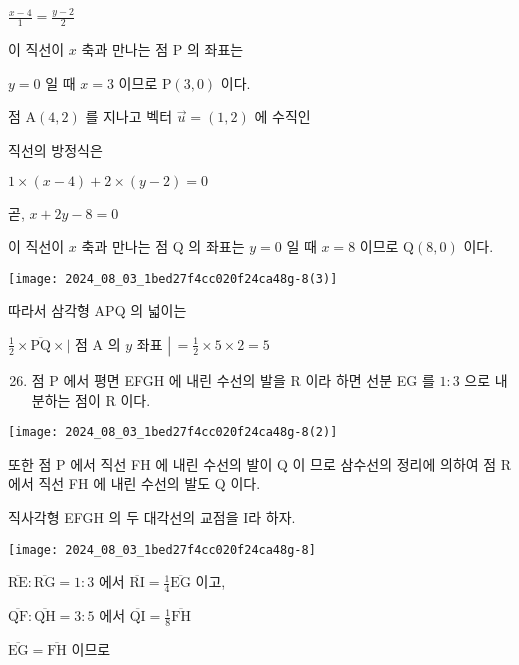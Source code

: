 \documentclass[10pt]{article}
\begin{document}
\(\frac{x-4}{1}=\frac{y-2}{2}\)

이 직선이 \(x\) 축과 만나는 점 P 의 좌표는

\(y=0\) 일 때 \(x=3\) 이므로 \(\mathrm{P}(3,0)\) 이다.

점 \(\mathrm{A}(4,2)\) 를 지나고 벡터 \(\vec{u}=(1,2)\) 에 수직인

직선의 방정식은

\(1 \times(x-4)+2 \times(y-2)=0\)

곧, \(x+2 y-8=0\)

이 직선이 \(x\) 축과 만나는 점 Q 의 좌표는 \(y=0\) 일 때 \(x=8\) 이므로 \(\mathrm{Q}(8,0)\) 이다.

\begin{center}
\texttt{[image: 2024\_08\_03\_1bed27f4cc020f24ca48g-8(3)]}
\end{center}

따라서 삼각형 APQ 의 넓이는

\(\frac{1}{2} \times \overline{\mathrm{PQ}} \times \mid\) 점 A 의 \(y\) 좌표 \(\left\lvert\,=\frac{1}{2} \times 5 \times 2=5\right.\)

\begin{enumerate}
  \setcounter{enumi}{25}
  \item 점 P 에서 평면 EFGH 에 내린 수선의 발을 R 이라 하면 선분 EG 를 \(1: 3\) 으로 내분하는 점이 R 이다.
\end{enumerate}

\begin{center}
\texttt{[image: 2024\_08\_03\_1bed27f4cc020f24ca48g-8(2)]}
\end{center}

또한 점 P 에서 직선 FH 에 내린 수선의 발이 Q 이 므로 삼수선의 정리에 의하여 점 R 에서 직선 FH 에 내린 수선의 발도 Q 이다.

직사각형 EFGH 의 두 대각선의 교점을 I라 하자.

\begin{center}
\texttt{[image: 2024\_08\_03\_1bed27f4cc020f24ca48g-8]}
\end{center}

\(\overline{\mathrm{RE}}: \overline{\mathrm{RG}}=1: 3\) 에서 \(\overline{\mathrm{RI}}=\frac{1}{4} \overline{\mathrm{EG}}\) 이고,

\(\overline{\mathrm{QF}}: \overline{\mathrm{QH}}=3: 5\) 에서 \(\overline{\mathrm{QI}}=\frac{1}{8} \overline{\mathrm{FH}}\)

\(\overline{\mathrm{EG}}=\overline{\mathrm{FH}}\) 이므로
\end{document}
